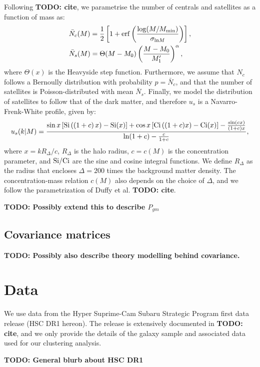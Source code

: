 \documentclass[a4paper,11pt]{article}
\newcommand{\todo}[1]{{\bf TODO: #1}}
\begin{document}
    Following \todo{cite}, we parametrise the number of centrals and satellites as a function of mass as:
    \begin{align}
      &\bar{N}_c(M)=\frac{1}{2}\left[1+{\rm erf}\left(\frac{\log(M/M_{\rm min})}{\sigma_{{\rm ln}M}}\right)\right],\\
      &\bar{N}_s(M)=\Theta(M-M_0)\left(\frac{M-M_0}{M_1'}\right)^\alpha,
    \end{align}
    where $\Theta(x)$ is the Heavyside step function. Furthermore, we assume that $N_c$ follows a Bernoully distribution with probability $p=\bar{N}_c$, and that the number of satellites is Poisson-distributed with mean $\bar{N}_s$. Finally, we model the distribution of satellites to follow that of the dark matter, and therefore $u_s$ is a Navarro-Frenk-White profile, given by:
    \begin{equation}
      u_s(k|M)=\frac{\sin x\left[{\rm Si}\left((1+c)\,x\right)-{\rm Si}(x)\right]+\cos x\left[{\rm Ci}\left((1+c)x\right)-{\rm Ci}(x)\right]-\frac{\sin(cx)}{(1+c)x}}{{\rm ln}(1+c)-\frac{c}{1+c}},
    \end{equation}
    where $x=k R_\Delta/c$, $R_\Delta$ is the halo radius, $c=c(M)$ is the concentration parameter, and ${\rm Si}/{\rm Ci}$ are the sine and cosine integral functions. We define $R_\Delta$ as the radius that encloses $\Delta=200$ times the background matter density. The concentration-mass relation $c(M)$ also depends on the choice of $\Delta$, and we follow the parametrization of Duffy et al. \todo{cite}.

    \todo{Possibly extend this to describe $P_{gm}$}
    
  \subsection{Covariance matrices}\label{ssec:theory.ssc}
    \todo{Possibly also describe theory modelling behind covariance. }
    \lipsum[3]

\section{Data}\label{sec:data}
  We use data from the Hyper Suprime-Cam Subaru Strategic Program first data release (HSC DR1 hereon). The release is extensively documented in \todo{cite}, and we only provide the details of the galaxy sample and associated data used for our clustering analysis. 
  
  \todo{General blurb about HSC DR1}
  
\end{document}

